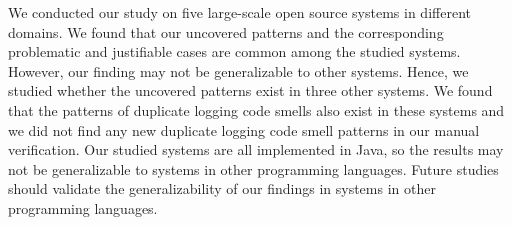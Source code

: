 



We conducted our study on five large-scale open source systems in different domains. We found that our uncovered patterns and the corresponding problematic and justifiable cases are common among the studied systems. However, our finding may not be generalizable to other systems. Hence, we studied whether the uncovered patterns exist in three other systems. We found that the patterns of duplicate logging code smells also exist in these systems and we did not find any new duplicate logging code smell patterns in our manual verification. Our studied systems are all implemented in Java, so the results may not be generalizable to systems in other programming languages. Future studies should validate the generalizability of our findings in systems in other programming languages.


\vspace{-0.1cm}
